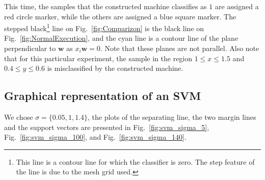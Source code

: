 \documentclass[letterpaper, 10 pt, conference]{ieeeconf}  %
\begin{document}
This time, the samples that the constructed machine classifies as $1$  are assigned a red circle marker, while the 
others are assigned a blue square marker. The stepped black\footnote{This line is a contour line for which the classifier is zero. 
The step feature of the line is due to the mesh grid used.} line on  Fig.~\ref{fig:Comparizon} is the black line on Fig.~\ref{fig:NormalExecution}, 
and the cyan line is a contour line of the plane perpendicular to $ \mathbf{w}$ as $x_{i}\mathbf{w}=0$. Note that these planes 
are not parallel. Also note that for this particular experiment,  the sample in the region $1 \leq x \leq1.5$ and $0.4 \leq y \leq 0.6$ 
is misclassified by the constructed machine.

\subsection{Graphical representation of an SVM}
\label{sec:ExperimentGraphicalRepresentationSVM}

We chose $\sigma = \{0.05, 1, 1.4\}$, the plots of the separating line, the two
margin lines and the support vectors are presented in Fig.~\ref{fig:svm_sigma_5}, Fig.~\ref{fig:svm_sigma_100}, and  
Fig.~\ref{fig:svm_sigma_140}.
\end{document}
